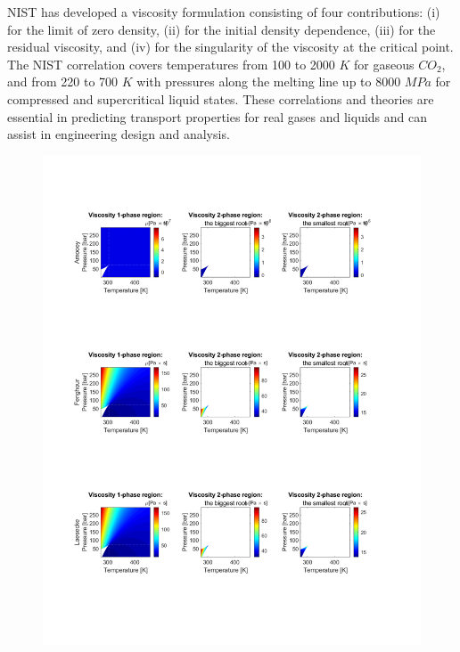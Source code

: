 \documentclass[../Article_Model_Parameters.tex]{subfiles}
\begin{document}
	NIST has developed a viscosity formulation consisting of four contributions: (i) for the limit of zero density, (ii) for the initial density dependence, (iii) for the residual viscosity, and (iv) for the singularity of the viscosity at the critical point. The NIST correlation covers temperatures from 100 to 2000 $K$ for gaseous $CO_2$, and from 220 to 700 $K$ with pressures along the melting line up to 8000 $MPa$ for compressed and supercritical liquid states. These correlations and theories are essential in predicting transport properties for real gases and liquids and can assist in engineering design and analysis.
	
	\begin{figure}[!h]
		\centering
		\includegraphics[trim = 1.5cm 12.0cm 14cm 10.0cm,clip,width=\columnwidth]{Figures/MU.pdf}	

\end{figure}
\end{document}
